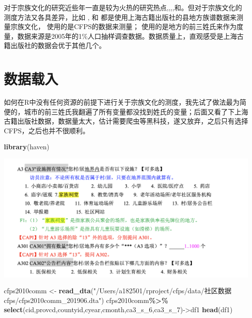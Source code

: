 \documentclass[
  oneside]{book}
\newenvironment{Shaded}{\begin{snugshade}}{\end{snugshade}}
\newcommand{\FunctionTok}[1]{\textcolor[rgb]{0.13,0.29,0.53}{\textbf{#1}}}
\newcommand{\NormalTok}[1]{#1}
\newcommand{\OtherTok}[1]{\textcolor[rgb]{0.56,0.35,0.01}{#1}}
\newcommand{\SpecialCharTok}[1]{\textcolor[rgb]{0.81,0.36,0.00}{\textbf{#1}}}
\newcommand{\StringTok}[1]{\textcolor[rgb]{0.31,0.60,0.02}{#1}}
\begin{document}
对于宗族文化的研究近些年一直是较为火热的研究热点\autocite{Cao2022},\autocite{Hanetsu2019a},\autocite{ZhangShinYi2021a},\autocite{ZhangKawagawa2017},\autocite{ZHANG2020100}和\autocite{FAN2023457}。但对于宗族文化的测度方法又各具差异，比如 \textcite{ZHANG2020100}, \textcite{Cao2022} 和 \textcite{FAN2023457} 都是使用上海古籍出版社的县地方族谱数据来测量宗族文化，\textcite{ZhangKawagawa2017} 使用的是CFPS的数据来测量；\textcite{ZhangShinYi2021a} 使用的是地方的前三姓氏来作为度量，数据来源是2005年的1\%人口抽样调查数据。数据质量上，直观感受是上海古籍出版社的数据会优于其他几个。

\hypertarget{ux6570ux636eux8f7dux5165}{%
\section{数据载入}\label{ux6570ux636eux8f7dux5165}}

如何在R中没有任何资源的前提下进行关于宗族文化的测度，我先试了做法最为简便的，城市的前三姓氏我翻遍了所有变量都没找到姓氏的变量；后面又看了下上海古籍出版社数据，数据量太大，估计需要爬虫等黑科技，遂又放弃，之后只有选择CFPS，之后也并不很顺利。

\begin{Shaded}
\begin{Highlighting}[]
\FunctionTok{library}\NormalTok{(haven)}
\end{Highlighting}
\end{Shaded}

\includegraphics{image/q1.png}

\begin{Shaded}
\begin{Highlighting}[]
\NormalTok{cfps2010comm }\OtherTok{\textless{}{-}} \FunctionTok{read\_dta}\NormalTok{(}\StringTok{"/Users/a182501/rproject/cfps/data/社区数据cfps/cfps2010comm\_201906.dta"}\NormalTok{)}
\NormalTok{cfps2010comm}\SpecialCharTok{\%\textgreater{}\%}
  \FunctionTok{select}\NormalTok{(cid,provcd,countyid,cyear,cmonth,ca3\_s\_6,ca3\_s\_7)}\OtherTok{{-}\textgreater{}}\NormalTok{df1}
\FunctionTok{head}\NormalTok{(df1)}
\end{Highlighting}
\end{Shaded}
\end{document}
